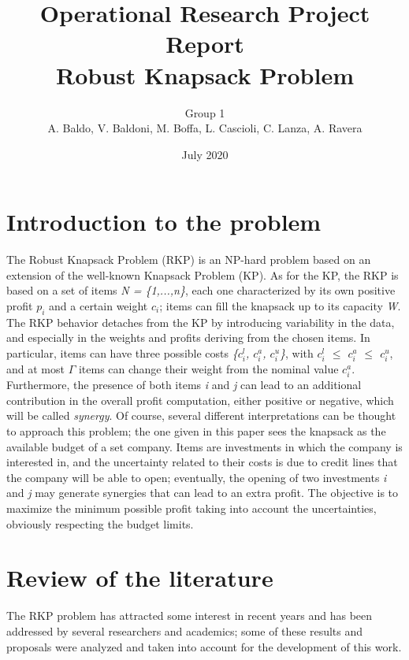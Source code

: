 \documentclass{article}
\title{Operational Research Project Report\\ \textbf{Robust Knapsack Problem}}
\author{Group 1\\A. Baldo, V. Baldoni, M. Boffa, L. Cascioli, C. Lanza, A. Ravera}
\date{July 2020}
\begin{document}

\section{Introduction to the problem}
The Robust Knapsack Problem (RKP) is an NP-hard problem based on an extension of the well-known Knapsack Problem (KP). As for the KP,  the RKP  is based on a set of items \textit{N = \{1,...,n\}}, each one characterized by its own positive profit $p_i$ and a certain weight $c_i$; items can  fill the knapsack up to its capacity \textit{W}. The RKP behavior detaches from the KP by introducing variability in the data, and especially in the weights and profits deriving from the chosen items. In particular, items can have three possible costs \textit{\{$c_i^l$, $c_i^a$, $c_i^u$\}}, with \textit{$c_i^l$ $\leq$ $c_i^a$ $\leq$ $c_i^u$},  and at most $\Gamma$ items can change their weight from the nominal value $c_i^a$. Furthermore, the presence of both items \textit{i} and \textit{j} can lead to an additional contribution in the overall profit computation, either positive or negative, which will be called \emph{synergy}. Of course, several different  interpretations can be thought to approach this problem; the one  given in this paper sees the knapsack as the available budget of a set company. Items are investments in which the company is interested in, and the uncertainty related to their costs is due to credit lines that the company will be able to open; eventually, the opening of two investments \textit{i} and \textit{j} may generate synergies that can lead to an extra profit. The objective is to maximize the minimum possible profit taking into account the uncertainties, obviously respecting the budget limits.

\section{Review of the literature}
The RKP problem has attracted some interest in recent years and has been addressed by several researchers and academics; some of these results and proposals were analyzed and taken into account for the development of this work. \\
\end{document}
